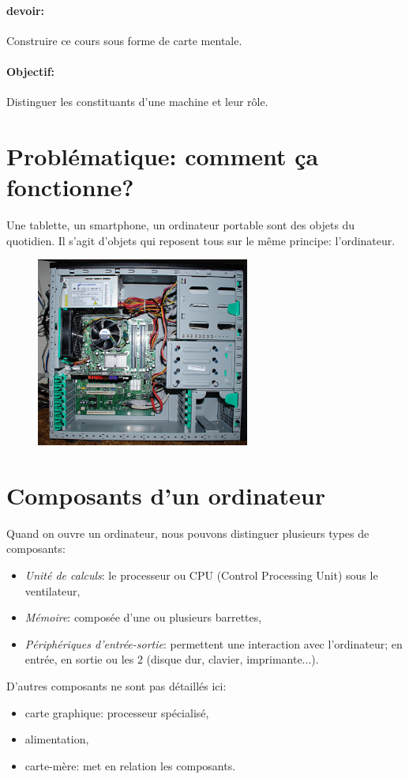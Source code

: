 \documentclass[a4paper,11pt]{article}
\begin{document}
\begin{Form}
\begin{commentprof}
\paragraph{devoir:} Construire ce cours sous forme de carte mentale.
\end{commentprof}
\paragraph{Objectif:}Distinguer les constituants d'une machine et leur rôle.

\section{Problématique: comment ça fonctionne?}
Une tablette, un smartphone, un ordinateur portable sont des objets du quotidien. Il s'agit d'objets qui reposent tous sur le même principe: l'ordinateur.
\begin{figure}[!h]
\centering
\includegraphics[width=7cm]{ressources/inside-pc.jpg}
\label{inside}
\end{figure}
\begin{center}
\end{center}
\section{Composants d'un ordinateur}
Quand on ouvre un ordinateur, nous pouvons distinguer plusieurs types de composants:
\begin{itemize}
\item \emph{Unité de calculs}: le processeur ou CPU (Control Processing Unit) sous le ventilateur,
\item \emph{Mémoire}: composée d'une ou plusieurs barrettes,
\item \emph{Périphériques d'entrée-sortie}: permettent une interaction avec l'ordinateur; en entrée, en sortie ou les 2 (disque dur, clavier, imprimante...).
\end{itemize}
D'autres composants ne sont pas détaillés ici:
\begin{itemize}
\item carte graphique: processeur spécialisé,
\item alimentation,
\item carte-mère: met en relation les composants.
\end{itemize}

\end{Form}
\end{document}

